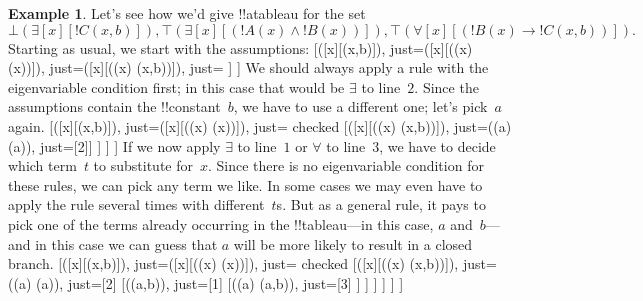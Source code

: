 \documentclass[10pt,a4paper]{article}
\theoremstyle{plain}
\theoremstyle{definition}
\newtheorem{ex}[thm]{Example}
\theoremstyle{remark}
\newenvironment{oltableau}{}{}
\providecommand{\lif}{\mathbin{\rightarrow}}
\providecommand{\lforall}{\mathord{\forall}}
\providecommand{\lexists}{\mathord{\exists}}
\providecommand{\sFmla}[2]{#1(#2)}
\providecommand{\formula}{\relax}
\providecommand{\True}{\top}
\providecommand{\False}{\bot}
\providecommand{\TAss}[1]{}
\providecommand{\TRule}[1]{}
\providecommand{\formula}[1]{#1}
\begin{document}
\begin{ex}
Let's see how we'd give !!a{tableau} for the set
\[
\sFmla{\False}{\lexists[x][!C(x,b)]},
\sFmla{\True}{\lexists[x][(!A(x) \land !B(x))]},
\sFmla{\True}{\lforall[x][(!B(x) \lif !C(x,b))]}.
\]
Starting as usual, we start with the assumptions:
\begin{oltableau}
  [\sFmla{\False}{\lexists[x][\formula{C}(x,b)]}, just=\TAss
    [\sFmla{\True}{\lexists[x][(\formula{A}(x) \land \formula{B}(x))]},
      just=\TAss
      [\sFmla{\True}{\lforall[x][(\formula{B}(x) \lif \formula{C}(x,b))]},
        just=\TAss]
    ]
  ]
\end{oltableau}
We should always apply a rule with the eigenvariable condition first;
in this case that would be $\TRule{\True}{\lexists}$ to
line~$2$. Since the assumptions contain the !!{constant}~$b$, we have
to use a different one; let's pick~$a$ again.
\begin{oltableau}
  [\sFmla{\False}{\lexists[x][\formula{C}(x,b)]}, just=\TAss
    [\sFmla{\True}{\lexists[x][(\formula{A}(x) \land \formula{B}(x))]},
      just=\TAss, checked
      [\sFmla{\True}{\lforall[x][(\formula{B}(x) \lif \formula{C}(x,b))]},
        just=\TAss
        [\sFmla{\True}{\formula{A}(a) \land \formula{B}(a)},
          just={\TRule{\True}{\lexists}[2]}]
      ]
    ]
  ]
\end{oltableau}
If we now apply $\TRule{\False}{\lexists}$ to line~$1$ or
$\TRule{\True}{\lforall}$ to line~$3$, we have to decide which term~$t$
to substitute for~$x$. Since there is no eigenvariable condition for
these rules, we can pick any term we like. In some cases we may even
have to apply the rule several times with different~$t$s. But as a
general rule, it pays to pick one of the terms already occurring in the
!!{tableau}---in this case, $a$ and~$b$---and in this case we can
guess that $a$ will be more likely to result in a closed branch.
\begin{oltableau}
  [\sFmla{\False}{\lexists[x][\formula{C}(x,b)]}, just=\TAss
    [\sFmla{\True}{\lexists[x][(\formula{A}(x) \land \formula{B}(x))]},
      just=\TAss, checked
      [\sFmla{\True}{\lforall[x][(\formula{B}(x) \lif \formula{C}(x,b))]}, just=\TAss
        [\sFmla{\True}{\formula{A}(a) \land \formula{B}(a)}, just={\TRule{\True}{\lexists}[2]}
          [\sFmla{\False}{\formula{C}(a,b)}, just={\TRule{\False}{\lexists}[1]}
            [\sFmla{\True}{\formula{B}(a) \lif \formula{C}(a,b)},
              just={\TRule{\True}{\lforall}[3]}
            ]
          ]
        ]
      ]
    ]
  ]
\end{oltableau}

\end{ex}
\end{document}
